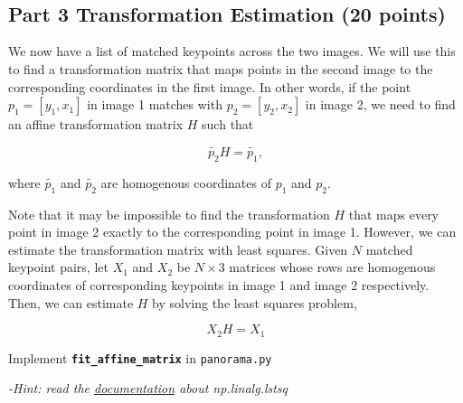 \documentclass[11pt]{article}
\begin{document}
    \begin{center}
    \end{center}
    { \hspace*{\fill} \\}
    
    \begin{center}
    \end{center}
    { \hspace*{\fill} \\}
    
    \hypertarget{part-3-transformation-estimation-20-points}{%
\subsection{Part 3 Transformation Estimation (20
points)}\label{part-3-transformation-estimation-20-points}}

We now have a list of matched keypoints across the two images. We will
use this to find a transformation matrix that maps points in the second
image to the corresponding coordinates in the first image. In other
words, if the point \(p_1 = [y_1,x_1]\) in image 1 matches with
\(p_2=[y_2, x_2]\) in image 2, we need to find an affine transformation
matrix \(H\) such that

\[
\tilde{p_2}H = \tilde{p_1},
\]

where \(\tilde{p_1}\) and \(\tilde{p_2}\) are homogenous coordinates of
\(p_1\) and \(p_2\).

Note that it may be impossible to find the transformation \(H\) that
maps every point in image 2 exactly to the corresponding point in image
1. However, we can estimate the transformation matrix with least
squares. Given \(N\) matched keypoint pairs, let \(X_1\) and \(X_2\) be
\(N \times 3\) matrices whose rows are homogenous coordinates of
corresponding keypoints in image 1 and image 2 respectively. Then, we
can estimate \(H\) by solving the least squares problem,

\[
X_2 H = X_1
\]

Implement \textbf{\texttt{fit\_affine\_matrix}} in \texttt{panorama.py}

\emph{-Hint: read the
\href{https://docs.scipy.org/doc/numpy/reference/generated/numpy.linalg.lstsq.html}{documentation}
about np.linalg.lstsq}
\end{document}
